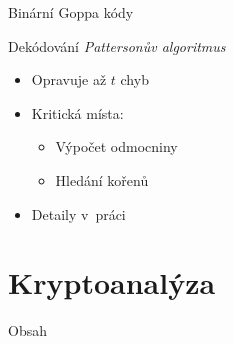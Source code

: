 \documentclass{beamer}
\begin{document}
\begin{frame}{Binární Goppa kódy}

    \begin{block}{Dekódování}
        \pause
        \emph{Pattersonův algoritmus}~\cite{Patterson}
            \pause
        \begin{itemize}
            \item Opravuje až $t$ chyb
            \item Kritická místa:
                \begin{itemize}
                    \item Výpočet odmocniny
                    \item Hledání kořenů
                \end{itemize}
            \pause
            \item Detaily v~práci
        \end{itemize}

    \end{block}

\end{frame}


\section{Kryptoanalýza}
\begin{frame}{Obsah}
    \tableofcontents[currentsection]
\end{frame}
\end{document}
